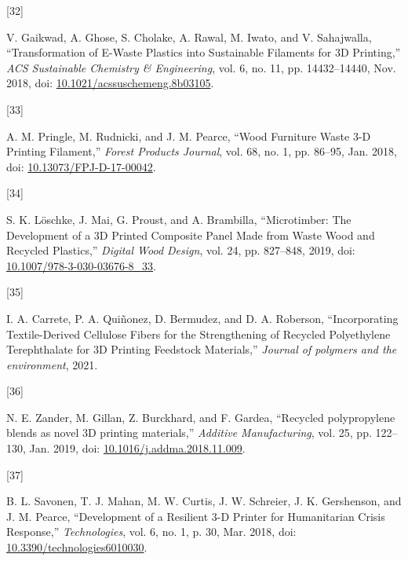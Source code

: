 \documentclass[
]{article}
\newlength{\cslhangindent}
\newlength{\csllabelwidth}
\newlength{\cslentryspacingunit} %
\newenvironment{CSLReferences}[2] %
 {%
  \setlength{\parindent}{0pt}
  \ifodd #1
  \let\oldpar\par
  \def\par{\hangindent=\cslhangindent\oldpar}
  \fi
  \setlength{\parskip}{#2\cslentryspacingunit}
 }%
 {}
\newcommand{\CSLLeftMargin}[1]{\parbox[t]{\csllabelwidth}{#1}}
\newcommand{\CSLRightInline}[1]{\parbox[t]{\linewidth - \csllabelwidth}{#1}\break}
\begin{document}
\begin{CSLReferences}{0}{0}
\leavevmode{}%
\CSLLeftMargin{{[}32{]} }%
\CSLRightInline{V. Gaikwad, A. Ghose, S. Cholake, A. Rawal, M. Iwato,
and V. Sahajwalla, {``Transformation of {E-Waste Plastics} into
{Sustainable Filaments} for {3D Printing},''} \emph{ACS Sustainable
Chemistry \& Engineering}, vol. 6, no. 11, pp. 14432--14440, Nov. 2018,
doi:
\href{https://doi.org/10.1021/acssuschemeng.8b03105}{10.1021/acssuschemeng.8b03105}.}

\leavevmode{}%
\CSLLeftMargin{{[}33{]} }%
\CSLRightInline{A. M. Pringle, M. Rudnicki, and J. M. Pearce, {``Wood
{Furniture Waste}\textendash{{Based Recycled}} 3-{D Printing
Filament},''} \emph{Forest Products Journal}, vol. 68, no. 1, pp.
86--95, Jan. 2018, doi:
\href{https://doi.org/10.13073/FPJ-D-17-00042}{10.13073/FPJ-D-17-00042}.}

\leavevmode{}%
\CSLLeftMargin{{[}34{]} }%
\CSLRightInline{S. K. Löschke, J. Mai, G. Proust, and A. Brambilla,
{``Microtimber: {The Development} of a {3D Printed Composite Panel Made}
from {Waste Wood} and {Recycled Plastics},''} \emph{Digital Wood
Design}, vol. 24, pp. 827--848, 2019, doi:
\href{https://doi.org/10.1007/978-3-030-03676-8_33}{10.1007/978-3-030-03676-8\_33}.}

\leavevmode{}%
\CSLLeftMargin{{[}35{]} }%
\CSLRightInline{I. A. Carrete, P. A. Quiñonez, D. Bermudez, and D. A.
Roberson, {``Incorporating {Textile-Derived Cellulose Fibers} for the
{Strengthening} of {Recycled Polyethylene Terephthalate} for {3D
Printing Feedstock Materials},''} \emph{Journal of polymers and the
environment}, 2021.}

\leavevmode{}%
\CSLLeftMargin{{[}36{]} }%
\CSLRightInline{N. E. Zander, M. Gillan, Z. Burckhard, and F. Gardea,
{``Recycled polypropylene blends as novel {3D} printing materials,''}
\emph{Additive Manufacturing}, vol. 25, pp. 122--130, Jan. 2019, doi:
\href{https://doi.org/10.1016/j.addma.2018.11.009}{10.1016/j.addma.2018.11.009}.}

\leavevmode{}%
\CSLLeftMargin{{[}37{]} }%
\CSLRightInline{B. L. Savonen, T. J. Mahan, M. W. Curtis, J. W.
Schreier, J. K. Gershenson, and J. M. Pearce, {``Development of a
{Resilient} 3-{D Printer} for {Humanitarian Crisis Response},''}
\emph{Technologies}, vol. 6, no. 1, p. 30, Mar. 2018, doi:
\href{https://doi.org/10.3390/technologies6010030}{10.3390/technologies6010030}.}


\end{CSLReferences}
\end{document}
